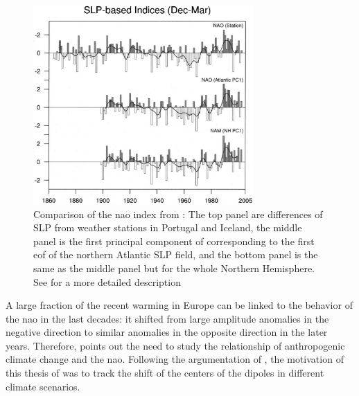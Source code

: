 \begin{figure}[htb]
  \begin{center}
    \includegraphics[width=0.75\textwidth]{figures/hurrel_nao_index_comparison.png}
  \end{center}
  \caption[NAO Index Comparison by Hurrel]{Comparison of the \ac{nao} index from \cite{hurrell_overview_2003}: The top panel are differences of SLP from weather stations in Portugal and Iceland, the middle panel is the first principal component of corresponding to the first \ac{eof} of the northern Atlantic SLP field, and the bottom panel is the same as the middle panel but for the whole Northern Hemisphere. See \cite{hurrell_overview_2003} for a more detailed description}
  \label{fig:naoindex_comparison}
\end{figure}

A large fraction of the recent warming in Europe can be linked to the behavior of the \ac{nao} in the last decades: it shifted from large amplitude anomalies in the negative direction to similar anomalies in the opposite direction in the later years. 
Therefore, \cite{hurrell_overview_2003} points out the need to study the relationship of anthropogenic climate change and the \ac{nao}. 
Following the argumentation of \cite{hurrell_overview_2003}, the motivation of this thesis of  was to track the shift of the centers of the dipoles in different climate scenarios.   

